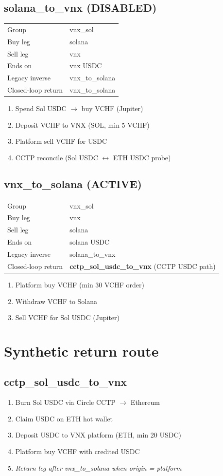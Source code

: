 \documentclass[11pt,a4paper]{article}
\begin{document}
\subsection*{\textcolor{warnred}{solana\_to\_vnx} (DISABLED)}
\begin{tabular}{@{}ll@{}}
Group & vnx\_sol \\
Buy leg & solana \\
Sell leg & vnx \\
Ends on & vnx USDC \\
Legacy inverse & vnx\_to\_solana \\
Closed-loop return & vnx\_to\_solana \\
\end{tabular}
\begin{enumerate}[nosep,leftmargin=*]
\item Spend Sol USDC $\rightarrow$ buy VCHF (Jupiter)
\item Deposit VCHF to VNX (SOL, min 5 VCHF)
\item Platform sell VCHF for USDC
\item CCTP reconcile (Sol USDC $\leftrightarrow$ ETH USDC probe)
\end{enumerate}
\subsection*{\textcolor{okgreen}{vnx\_to\_solana} (ACTIVE)}
\begin{tabular}{@{}ll@{}}
Group & vnx\_sol \\
Buy leg & vnx \\
Sell leg & solana \\
Ends on & solana USDC \\
Legacy inverse & solana\_to\_vnx \\
Closed-loop return & \textbf{cctp\_sol\_usdc\_to\_vnx} (CCTP USDC path) \\
\end{tabular}
\begin{enumerate}[nosep,leftmargin=*]
\item Platform buy VCHF (min 30 VCHF order)
\item Withdraw VCHF to Solana
\item Sell VCHF for Sol USDC (Jupiter)
\end{enumerate}
\section*{Synthetic return route}
\subsection*{cctp\_sol\_usdc\_to\_vnx}
\begin{enumerate}[nosep,leftmargin=*]
\item Burn Sol USDC via Circle CCTP $\rightarrow$ Ethereum
\item Claim USDC on ETH hot wallet
\item Deposit USDC to VNX platform (ETH, min 20 USDC)
\item Platform buy VCHF with credited USDC
\item \textit{Return leg after vnx\_to\_solana when origin = platform}
\end{enumerate}
\end{document}
